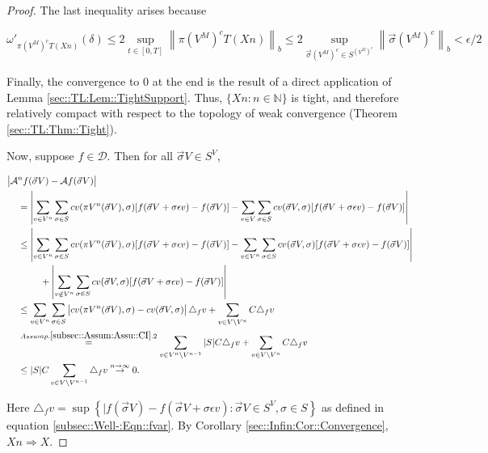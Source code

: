 \documentclass[12pt]{article}
\newcommand{\mb}{\mathbb}
\newcommand{\mc}{\mathcal}
\newcommand{\ra}{\rightarrow}
\newcommand{\os}{\overset}
\newcommand{\ep}{\epsilon}
\newcommand{\ind}{\hspace{24pt}}
\renewcommand{\v}{v}							%
\renewcommand{\S}{S}							%
\newcommand{\s}{\sigma}							%
\newcommand{\sv}{\vec{\s}}						%
\renewcommand{\b}{b}							%
\newcommand{\ev}{\ep}							%
\newcommand{\T}{T}								%
\renewcommand{\t}{t}							%
\newcommand{\proj}{\pi}							%
\newcommand{\X}{X}								%
\newcommand{\IG}{\mc{A}}						%
\newcommand{\IGr}{c}							%
\newcommand{\f}{f}								%
\newcommand{\const}{C}							%
\newcommand{\sln}[1]{^{#1}}						%
\newcommand{\core}{\mc{D}}						%
\newcommand{\delt}{\triangle}					%
\newcommand{\cconst}{M}							%
\newcommand{\cmodu}{\omega'}					%
\newcommand{\deltf}[1]{_{#1}}					%
\begin{document}
\begin{proof}
The last inequality arises because

\[\cmodu_{\proj{\left( V\sln{\cconst}\right)^c}{\T}(\X{}{}{n})}(\delta) \leq 2 \sup_{\t\in [0,\T]} \left\|\proj{\left( V\sln{\cconst}\right)^c}{\T}(\X{}{}{n})\right\|_{\b{}} \leq 2 \sup_{\sv{}{\left( V\sln{\cconst}\right)^c} \in \S^{\left( V\sln{\cconst}\right)^c}} \left\|\sv{}{\left( V\sln{\cconst}\right)^c}\right\|_{\b{}} < \ep/2\]

Finally, the convergence to 0 at the end is the result of a direct application of Lemma \ref{sec::TL:Lem::TightSupport}. Thus, \(\{\X{}{}{n}:n\in \mb{N}\}\) is tight, and therefore relatively compact with respect to the topology of weak convergence (Theorem \ref{sec::TL:Thm::Tight}).

Now, suppose \(f\in \core\). Then for all \(\sv{}{ V} \in \S^ V\),

\begin{align*}
\big|\IG&\sln{n}f(\sv{}{ V}) - \IG f(\sv{}{ V})\big|\\
&= \left|\sum_{\v \in  V\sln{n}} \sum_{\s \in \S} \IGr{\v}(\proj{ V\sln{n}}{}(\sv{}{ V}),\s)[f(\sv{}{ V}+\s\ev{\v}) - f(\sv{}{ V})] - \sum_{\v \in  V}\sum_{\s \in \S} \IGr{\v}(\sv{}{ V},\s)[f(\sv{}{ V}+\s\ev{\v}) - f(\sv{}{ V})]\right|\\
&\leq  \left|\sum_{\v \in  V\sln{n}} \sum_{\s \in \S} \IGr{\v}(\proj{ V\sln{n}}{}(\sv{}{ V}),\s)[f(\sv{}{ V}+\s\ev{\v}) - f(\sv{}{ V})] - \sum_{\v \in  V\sln{n}}\sum_{\s \in \S} \IGr{\v}(\sv{}{ V},\s)[f(\sv{}{ V}+\s\ev{\v}) - f(\sv{}{ V})]\right|\\
&\ind  +\left|\sum_{\v \notin  V\sln{n}} \sum_{\s\in \S} \IGr{\v}(\sv{}{ V},\s)[f(\sv{}{ V}+\s\ev{\v}) - f(\sv{}{ V})]\right|\\
&\leq \sum_{\v \in  V\sln{n}}\sum_{\s \in \S} \left|\IGr{\v}(\proj{ V\sln{n}}{}(\sv{}{ V}),\s) - \IGr{\v}(\sv{}{ V},\s)\right|\delt\deltf{\f}{\v} + \sum_{\v \in  V\setminus  V\sln{n}} \const{}\delt\deltf{\f}{\v}\\
&\os{Assump. \ref{subsec::Assum:Assu::CI}.2}{=} \sum_{\v \in  V\sln{n}\setminus V\sln{n-1}} |\S|\const{} \delt\deltf{\f}{\v} + \sum_{\v \in  V\setminus  V\sln{n}} \const{}\delt\deltf{\f}{\v}\\
&\leq |\S|C\sum_{\v \in  V\setminus  V\sln{n-1}} \delt\deltf{\f}{\v} \os{n\ra\infty}{\ra} 0.
\end{align*}

Here \(\delt\deltf{\f}{\v} = \sup\left\{|f(\sv{}{ V}) - f(\sv{}{ V} + \s\ev{\v}): \sv{}{ V}\in \S^ V,\s \in \S\right\}\) as defined in equation \eqref{subsec::Well-:Eqn::fvar}. By Corollary \ref{sec::Infin:Cor::Convergence}, \(\X{}{}{n}\Rightarrow \X{}{}\).
\end{proof}
\end{document}
